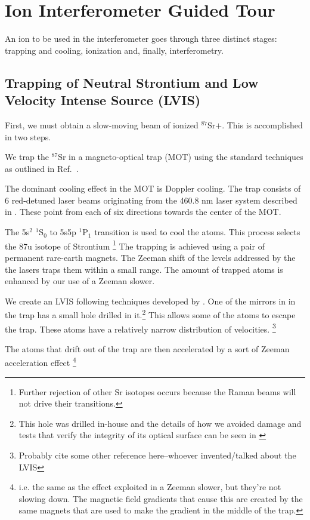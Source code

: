 \chapter{Ion Interferometer Guided Tour}
An ion to be used in the interferometer goes through three distinct stages: trapping and cooling, ionization and, finally, interferometry. 


\section{Trapping of Neutral Strontium and Low Velocity Intense Source (LVIS)}

First, we must obtain a slow-moving beam of ionized $^{87}$Sr$+$. This is accomplished in two steps. 

We trap the $^{87}$Sr in a magneto-optical trap (MOT) using the standard techniques as outlined in Ref.\ \cite{cjeDiss}. 

The dominant cooling effect in the MOT is Doppler cooling. The trap consists of 6 red-detuned laser beams originating from the 460.8 nm laser system described in \cite{cjeDiss}. These point from each of six directions towards the center of the MOT. 

The 5s$^2$ $^1$S$_0$ to 5s5p $^1$P$_1$ transition is used to cool the atoms. This process selects the 87u isotope of Strontium \footnote{Further rejection of other Sr isotopes occurs because the Raman beams will not drive their transitions.}
The trapping is achieved using a pair of permanent rare-earth magnets. The Zeeman shift of the levels addressed by the the lasers traps them within a small range. The amount of trapped atoms is enhanced by our use of a Zeeman slower. 



We create an LVIS \cite{cjeDiss} following techniques developed by \cite{LVIS}. One of the mirrors in in the trap has a small hole drilled in it.\footnote{This hole was drilled in-house and the details of how we avoided damage and tests that verify the integrity of its optical surface can be seen in \cite{cjeDiss}} This allows some of the atoms to escape the trap. These atoms have a relatively narrow distribution of velocities. \footnote{Probably cite some other reference here--whoever invented/talked about the LVIS}

The atoms that drift out of the trap are then accelerated by a sort of Zeeman acceleration effect \footnote{i.e. the same as the effect exploited in a Zeeman slower, but they're not slowing down. The magnetic field gradients that cause this are created by the same magnets that are used to make the gradient in the middle of the trap.}

